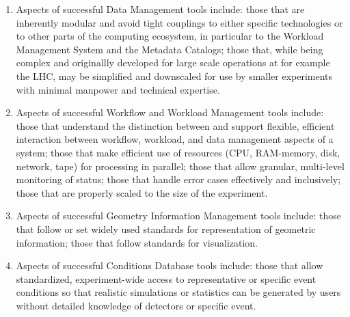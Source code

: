 \begin{enumerate}
\item Aspects of successful Data Management tools include:
those that are inherently modular and avoid tight couplings to either 
specific technologies or to other parts of the computing ecosystem, in 
particular to the Workload Management System and the Metadata Catalogs;  
those that, while being complex and originallly developed for large scale operations 
at for example the LHC, may be simplified and downscaled for use by smaller experiments 
with minimal manpower and technical expertise. 

\item Aspects of successful Workflow and Workload Management tools include:
those that understand the distinction between and support flexible, efficient 
interaction between workflow, workload, and data management aspects 
of a system; those that make efficient use of resources (CPU, RAM-memory, 
disk, network, tape) for processing in parallel;  those that allow 
granular, multi-level monitoring of status; those that handle error 
cases effectively and inclusively; those that are properly scaled 
to the size of the experiment.

\item Aspects of successful Geometry Information Management tools include:
those that follow or set widely used standards for representation of
geometric information; those that follow standards for visualization.

\item Aspects of successful Conditions Database tools include:
those that allow standardized, experiment-wide access to representative 
or specific event conditions so that realistic simulations or statistics
can be generated by users without detailed knowledge of detectors or specific
event.

\end{enumerate}

